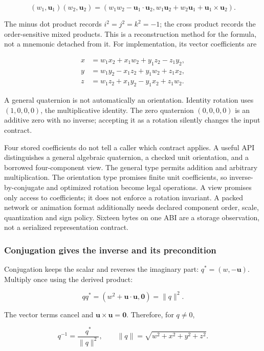 \[
(w_1,\mathbf u_1)(w_2,\mathbf u_2)=
\left(w_1w_2-\mathbf u_1\cdot\mathbf u_2,
w_1\mathbf u_2+w_2\mathbf u_1+\mathbf u_1\times\mathbf u_2\right).
\]

The minus dot product records \(i^2=j^2=k^2=-1\); the cross product records the order-sensitive mixed products. This is a reconstruction method for the formula, not a mnemonic detached from it. For implementation, its vector coefficients are

\[
\begin{aligned}
x&=w_1x_2+x_1w_2+y_1z_2-z_1y_2,\\
y&=w_1y_2-x_1z_2+y_1w_2+z_1x_2,\\
z&=w_1z_2+x_1y_2-y_1x_2+z_1w_2.
\end{aligned}
\]

A general quaternion is not automatically an orientation. Identity rotation uses \((1,0,0,0)\), the multiplicative identity. The zero quaternion \((0,0,0,0)\) is an additive zero with no inverse; accepting it as a rotation silently changes the input contract.

Four stored coefficients do not tell a caller which contract applies. A useful API distinguishes a general algebraic quaternion, a checked unit orientation, and a borrowed four-component view. The general type permits addition and arbitrary multiplication. The orientation type promises finite unit coefficients, so inverse-by-conjugate and optimized rotation become legal operations. A view promises only access to coefficients; it does not enforce a rotation invariant. A packed network or animation format additionally needs declared component order, scale, quantization and sign policy. Sixteen bytes on one ABI are a storage observation, not a serialized representation contract.

\subsubsection{Conjugation gives the inverse and its precondition}\label{conjugation-gives-the-inverse-and-its-precondition}

Conjugation keeps the scalar and reverses the imaginary part: \(q^*=(w,-\mathbf u)\). Multiply once using the derived product:

\[
qq^*=(w^2+\mathbf u\cdot\mathbf u,\mathbf0)
=\|q\|^2.
\]

The vector terms cancel and \(\mathbf u\times\mathbf u=\mathbf0\). Therefore, for \(q\ne0\),

\[
q^{-1}=\frac{q^*}{\|q\|^2},
\qquad
\|q\|=\sqrt{w^2+x^2+y^2+z^2}.
\]


